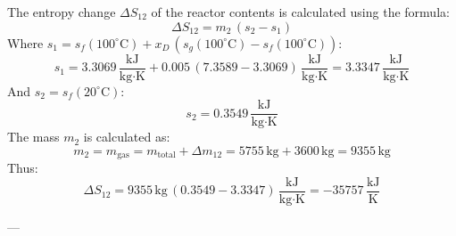The entropy change \( \Delta S_{12} \) of the reactor contents is calculated using the formula:  
\[
\Delta S_{12} = m_2 \, (s_2 - s_1)
\]  
Where \( s_1 = s_f(100^\circ\text{C}) + x_D \, (s_g(100^\circ\text{C}) - s_f(100^\circ\text{C})) \):  
\[
s_1 = 3.3069 \, \frac{\text{kJ}}{\text{kg·K}} + 0.005 \, (7.3589 - 3.3069) \, \frac{\text{kJ}}{\text{kg·K}} = 3.3347 \, \frac{\text{kJ}}{\text{kg·K}}
\]  
And \( s_2 = s_f(20^\circ\text{C}) \):  
\[
s_2 = 0.3549 \, \frac{\text{kJ}}{\text{kg·K}}
\]  
The mass \( m_2 \) is calculated as:  
\[
m_2 = m_{\text{gas}} = m_{\text{total}} + \Delta m_{12} = 5755 \, \text{kg} + 3600 \, \text{kg} = 9355 \, \text{kg}
\]  
Thus:  
\[
\Delta S_{12} = 9355 \, \text{kg} \, (0.3549 - 3.3347) \, \frac{\text{kJ}}{\text{kg·K}} = -35757 \, \frac{\text{kJ}}{\text{K}}
\]

---